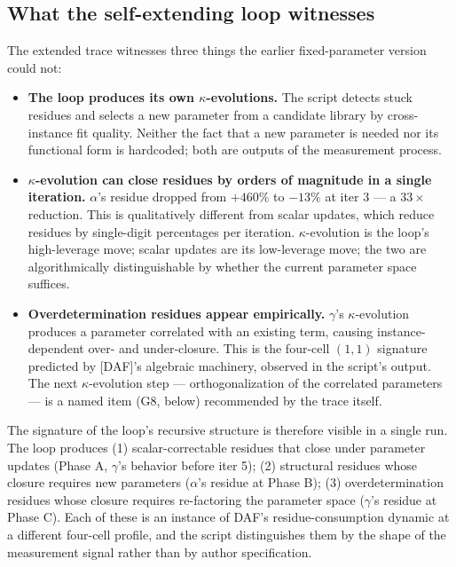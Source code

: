 \subsection{What the self-extending loop witnesses}
\label{app-f:self-ext-witness}

The extended trace witnesses three things the earlier
fixed-parameter version could not:

\begin{itemize}[nosep]
  \item \textbf{The loop produces its own
    $\kappa$-evolutions.} The script detects stuck
    residues and selects a new parameter from a
    candidate library by cross-instance fit quality.
    Neither the fact that a new parameter is needed
    nor its functional form is hardcoded; both are
    outputs of the measurement process.

  \item \textbf{$\kappa$-evolution can close residues
    by orders of magnitude in a single iteration.}
    $\alpha$'s residue dropped from $+460\%$ to
    $-13\%$ at iter 3 --- a $33\times$ reduction. This
    is qualitatively different from scalar updates,
    which reduce residues by single-digit percentages
    per iteration. $\kappa$-evolution is the
    loop's high-leverage move; scalar updates are its
    low-leverage move; the two are algorithmically
    distinguishable by whether the current parameter
    space suffices.

  \item \textbf{Overdetermination residues appear
    empirically.} $\gamma$'s $\kappa$-evolution
    produces a parameter correlated with an existing
    term, causing instance-dependent over- and
    under-closure. This is the four-cell $(1,1)$
    signature predicted by [DAF]'s algebraic
    machinery, observed in the script's output. The
    next $\kappa$-evolution step --- orthogonalization
    of the correlated parameters --- is a named item
    (G8, below) recommended by the trace itself.
\end{itemize}

The signature of the loop's recursive structure is
therefore visible in a single run. The loop produces
(1) scalar-correctable residues that close under
parameter updates (Phase A, $\gamma$'s behavior before
iter 5); (2) structural residues whose closure
requires new parameters ($\alpha$'s residue at Phase B);
(3) overdetermination residues whose closure requires
re-factoring the parameter space ($\gamma$'s residue at
Phase C). Each of these is an instance of DAF's
residue-consumption dynamic at a different four-cell
profile, and the script distinguishes them by the
shape of the measurement signal rather than by author
specification.

